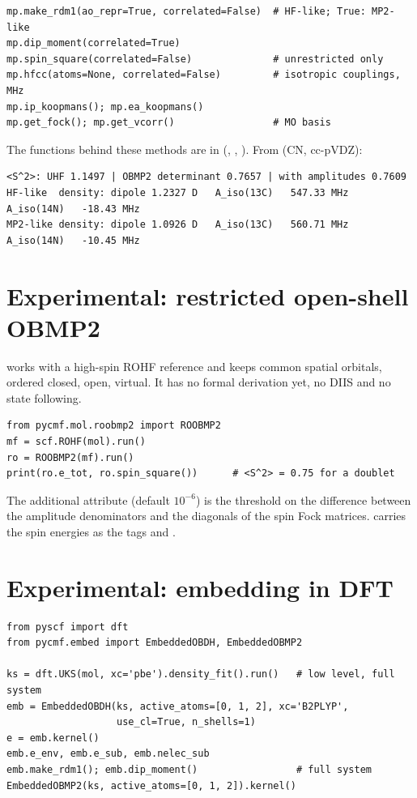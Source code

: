\begin{lstlisting}[style=python]
mp.make_rdm1(ao_repr=True, correlated=False)  # HF-like; True: MP2-like
mp.dip_moment(correlated=True)
mp.spin_square(correlated=False)              # unrestricted only
mp.hfcc(atoms=None, correlated=False)         # isotropic couplings, MHz
mp.ip_koopmans(); mp.ea_koopmans()
mp.get_fock(); mp.get_vcorr()                 # MO basis
\end{lstlisting}

The functions behind these methods are in 
(, , ). From
 (CN, cc-pVDZ):

\begin{lstlisting}[style=output]
<S^2>: UHF 1.1497 | OBMP2 determinant 0.7657 | with amplitudes 0.7609
HF-like  density: dipole 1.2327 D   A_iso(13C)   547.33 MHz   A_iso(14N)   -18.43 MHz
MP2-like density: dipole 1.0926 D   A_iso(13C)   560.71 MHz   A_iso(14N)   -10.45 MHz
\end{lstlisting}

\section{Experimental: restricted open-shell OBMP2}
\label{sec:roobmp2}

 works with a high-spin ROHF reference and keeps common spatial
orbitals, ordered closed, open, virtual. It has no formal derivation yet, no
DIIS and no state following.

\begin{lstlisting}[style=python]
from pycmf.mol.roobmp2 import ROOBMP2
mf = scf.ROHF(mol).run()
ro = ROOBMP2(mf).run()
print(ro.e_tot, ro.spin_square())      # <S^2> = 0.75 for a doublet
\end{lstlisting}

The additional attribute  (default $10^{-6}$) is the
threshold on the difference between the amplitude denominators and the
diagonals of the spin Fock matrices.  carries the spin
energies as the tags  and .

\section{Experimental: embedding in DFT}
\label{sec:embedding}

\begin{lstlisting}[style=python]
from pyscf import dft
from pycmf.embed import EmbeddedOBDH, EmbeddedOBMP2

ks = dft.UKS(mol, xc='pbe').density_fit().run()   # low level, full system
emb = EmbeddedOBDH(ks, active_atoms=[0, 1, 2], xc='B2PLYP',
                   use_cl=True, n_shells=1)
e = emb.kernel()
emb.e_env, emb.e_sub, emb.nelec_sub
emb.make_rdm1(); emb.dip_moment()                 # full system
EmbeddedOBMP2(ks, active_atoms=[0, 1, 2]).kernel()
\end{lstlisting}


